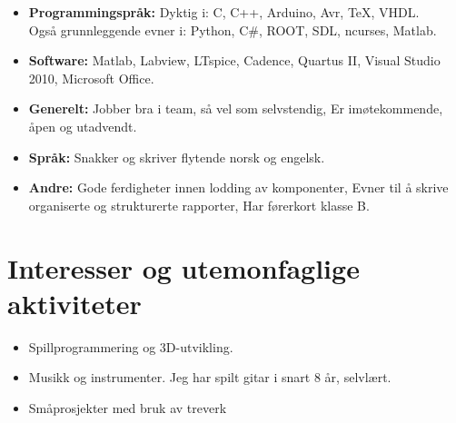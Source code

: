 \documentclass[11pt,a4paper,sans,norsk]{moderncv}        %
\begin{document}
\begin{itemize}

\item \textbf{Programmingspråk:} Dyktig i: C, C++, Arduino, Avr, TeX, VHDL. \\ Også grunnleggende evner i: Python, C\#, ROOT, SDL, ncurses, Matlab.

\vspace{6pt}

\item \textbf{Software:} Matlab, Labview, LTspice, Cadence, Quartus II, Visual Studio 2010, Microsoft Office.

\vspace{6pt}

\item \textbf{Generelt:} Jobber bra i team, så vel som selvstendig, Er imøtekommende, åpen og utadvendt.

\vspace{6pt}

\item \textbf{Språk:} Snakker og skriver flytende norsk og engelsk.

\vspace{6pt}

\item \textbf{Andre:} Gode ferdigheter innen lodding av komponenter, Evner til å skrive organiserte og strukturerte rapporter, Har førerkort klasse B.

\end{itemize}


\section{Interesser og utemonfaglige aktiviteter}

\vspace{6pt}

\begin{itemize}

\item{Spillprogrammering og 3D-utvikling.}

\vspace{6pt}

\item{Musikk og instrumenter. Jeg har spilt gitar i snart 8 år, selvlært.}

\vspace{6pt}

\item{Småprosjekter med bruk av treverk}



\end{itemize}
\end{document}
